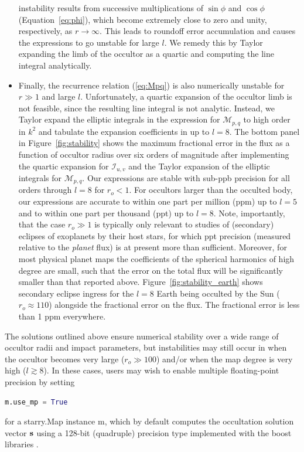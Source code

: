 \documentclass[modern]{aastex61}
\begin{document}
\begin{itemize}
instability results from successive multiplications of $\sin\phi$  and $\cos\phi$ (Equation~\ref{eq:phi}),
which become extremely close to zero and unity, respectively, as $r \rightarrow \infty$. This leads
to roundoff error accumulation and causes the expressions to go unstable for large $l$.
We remedy this by Taylor expanding the limb of the occultor as a quartic and computing the line integral
analytically.
%
\item Finally, the recurrence relation (\ref{eq:Mpq}) is also numerically unstable for $r \gg 1$ and large $l$.
Unfortunately, a quartic expansion of the occultor limb is not feasible, since the resulting line
integral is not analytic. Instead, we Taylor expand the elliptic integrals in the expression for $\mathcal{M}_{p,q}$
to high order in $k^2$ and tabulate the expansion coefficients in \starry up to $l = 8$.
The bottom panel in Figure~\ref{fig:stability} shows the maximum fractional error in the flux
as a function of occultor radius over six orders of magnitude after implementing the quartic expansion
for $\mathcal{I}_{u,v}$ and the Taylor expansion of the elliptic integrals for $\mathcal{M}_{p,q}$.
Our expressions are stable with sub-ppb precision for all orders through $l = 8$ for $r_o < 1$.
For occultors larger than the occulted body, our expressions are accurate to within
one part per million (ppm) up to $l = 5$ and to within one part per thousand (ppt) up to $l = 8$.
Note, importantly, that the case $r_o \gg 1$ is typically only relevant to studies of
(secondary) eclipses of exoplanets by their host stars, for which ppt precision (measured relative
to the \emph{planet} flux) is at present more than sufficient. Moreover, for most physical planet maps
the coefficients of the spherical harmonics of high degree are small, such that the error on the
total flux will be significantly smaller than that reported above.
Figure~\ref{fig:stability_earth} shows secondary eclipse ingress for the $l = 8$ Earth being
occulted by the Sun ($r_o \approx 110$) alongside the fractional error on the flux.
The fractional error is less than 1 ppm everywhere.
\end{itemize}

The solutions outlined above ensure numerical stability over a wide range of occultor radii and impact
parameters, but instabilities may still occur in \starry when the occultor becomes very large
($r_o \gg 100$) and/or when the map degree is very high ($l \gtrsim 8$). In these cases, users may wish
to enable multiple floating-point precision by setting
%
\begin{lstlisting}[language=Python,firstnumber=last]
m.use_mp = True
\end{lstlisting}
%
for a \textsf{starry.Map} instance \textsf{m}, which by default computes the occultation solution
vector ${\mathbf{s}}$ using a 128-bit (quadruple) precision type implemented with the \textsf{boost}
\cpp libraries \citep[e.g.,][]{Schaling2014}.
\end{document}
